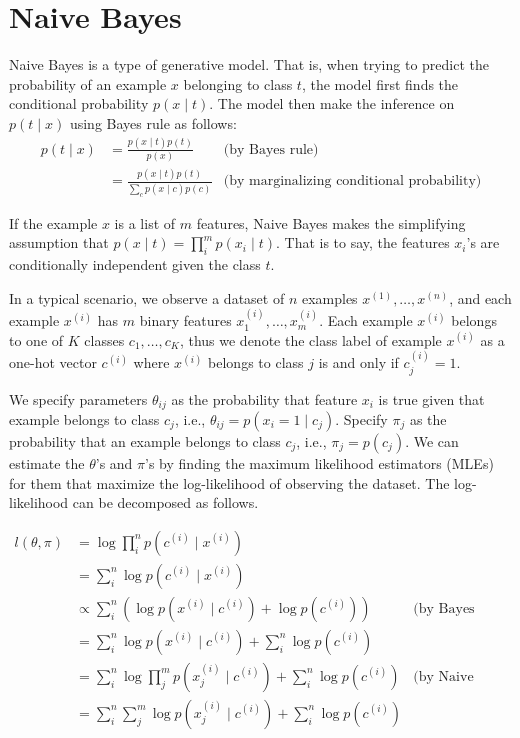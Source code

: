 \setcounter{chapter}{3}
\chapter{Naive Bayes}
Naive Bayes is a type of generative model. That is, when trying to predict the probability of an example $x$ belonging to class $t$, the model first finds the conditional probability $p(x \mid t)$. The model then make the inference on $p(t \mid x)$ using Bayes rule as follows: 
\begin{align*}
    p(t \mid x) &= \frac{p(x \mid t) p(t)}{p(x)} & \mbox{(by Bayes rule)} \\
    &= \frac{p(x \mid t) p(t)}{\sum_{c} p(x \mid c) p(c)} & \mbox{(by marginalizing conditional probability)}
\end{align*}

If the example $x$ is a list of $m$ features, Naive Bayes makes the simplifying assumption that $p(x \mid t) = \prod^{m}_{i}p(x_i \mid t)$. That is to say, the features $x_i$'s are conditionally independent given the class $t$.

In a typical scenario, we observe a dataset of $n$ examples $x^{(1)}, \dots, x^{(n)}$, and each example $x^{(i)}$ has $m$ binary features $x^{(i)}_1, \dots, x^{(i)}_m$. Each example $x^{(i)}$ belongs to one of $K$ classes $c_1, \dots, c_K$, thus we denote the class label of example $x^{(i)}$ as a one-hot vector $c^{(i)}$ where $x^{(i)}$ belongs to class $j$ is and only if $c^{(i)}_j = 1$. 

We specify parameters $\theta_{ij}$ as the probability that feature $x_i$ is true given that example belongs to class $c_j$, i.e., $\theta_{ij} = p(x_i = 1 \mid c_j)$. Specify $\pi_j$ as the probability that an example belongs to class $c_j$, i.e., $\pi_j = p(c_j)$.  We can estimate the $\theta$'s and $\pi$'s by finding the maximum likelihood estimators (MLEs) for them that maximize the log-likelihood of observing the dataset. The log-likelihood can be decomposed as follows.

\begin{align*}
    l(\theta, \pi) &= \log \prod^{n}_{i} p(c^{(i)} \mid x^{(i)}) \\
    &= \sum^{n}_{i} \log p(c^{(i)} \mid x^{(i)}) \\
    &\propto \sum^{n}_{i} \left( \log p(x^{(i)} \mid c^{(i)})  + \log p(c^{(i)}) \right) & \mbox{(by Bayes rule)} \\
    &= \sum^{n}_{i} \log p(x^{(i)} \mid c^{(i)}) + \sum^{n}_{i} \log p(c^{(i)}) \\
    &= \sum^{n}_{i} \log \prod^{m}_{j} p(x^{(i)}_{j} \mid c^{(i)}) + \sum^{n}_{i} \log p(c^{(i)}) &\mbox{(by Naive Bayes assumption)} \\
    &= \sum^{n}_{i} \sum^{m}_{j} \log p(x^{(i)}_{j} \mid c^{(i)}) + \sum^{n}_{i} \log p(c^{(i)})
\end{align*}

